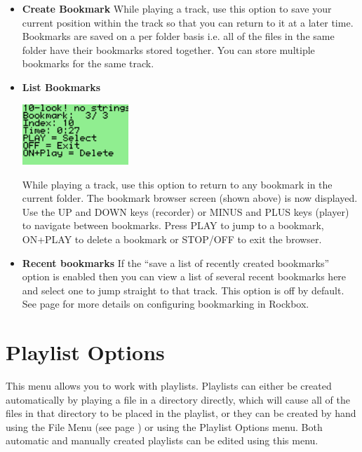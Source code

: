 \begin{itemize}
  
\item \textbf{Create Bookmark}
  While playing a track, use this option to save your current position within the track so that you can return to it at a later time.  Bookmarks are saved on a per folder basis i.e. all of the files in the same folder have their bookmarks stored together. You can store multiple bookmarks for the same track.
  
\item \textbf{List Bookmarks}
  \begin{center}
    \includegraphics[width=4cm]{main_menu/images/ss-list-bookmarks-112x64x1.png}
  \end{center}
  While playing a track, use this option to return to any bookmark in the current folder.  The bookmark browser screen (shown above) is now displayed.  Use the UP and DOWN keys (recorder) or MINUS and PLUS keys (player) to navigate between bookmarks.  Press PLAY to jump to a bookmark, ON+PLAY to delete a bookmark or STOP/OFF to exit the browser.
  
\item \textbf {Recent bookmarks}
  If the ``save a list of recently created bookmarks'' option is enabled then you can view a list of several recent bookmarks here and select one to jump straight to that track.  This option is off by default. See page \pageref{ref:Bookmarkconfigactual} for more details on configuring bookmarking in Rockbox.
\end{itemize}

\section{\label{ref:playlistoptions}Playlist Options}
This menu allows you to work with playlists. Playlists can either be created automatically by playing a file in a directory directly, which will cause all of the files in that directory to be placed in the playlist, or they can be created by hand using the File Menu (see page \pageref{ref:Filemenu}) or using the Playlist Options menu.  Both  automatic and manually created playlists can be edited using this menu.

